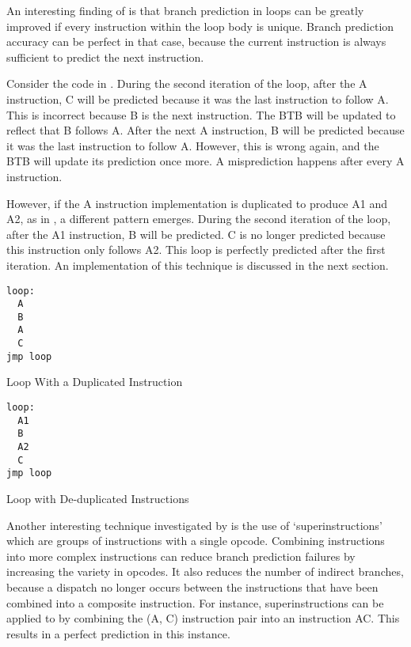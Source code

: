 		An interesting finding of \cite{optimizingindirectbranch} is that branch prediction in loops can be greatly improved if every instruction within the loop body is unique. Branch prediction accuracy can be perfect in that case, because the current instruction is always sufficient to predict the next instruction. 
		
		Consider the code in . During the second iteration of the loop, after the A instruction, C will be predicted because it was the last instruction to follow A. This is incorrect because B is the next instruction. The BTB will be updated to reflect that B follows A. After the next A instruction, B will be predicted because it was the last instruction to follow A. However, this is wrong again, and the BTB will update its prediction once more. A misprediction happens after every A instruction.
		
		However, if the A instruction implementation is duplicated to produce A1 and A2, as in , a different pattern emerges. During the second iteration of the loop, after the A1 instruction, B will be predicted. C is no longer predicted because this instruction only follows A2. This loop is perfectly predicted after the first iteration. An implementation of this technique is discussed in the next section.
		
		\begin{doublefig}
			\begin{halffig}
				\begin{lstlisting}
loop:
  A
  B
  A
  C
jmp loop
  				\end{lstlisting}
				\caption{Loop With a Duplicated Instruction}
				\label{fig:duplicatedinstructions}
			\end{halffig}
			\begin{halffig}
				\begin{lstlisting}
loop:
  A1
  B
  A2
  C
jmp loop
				\end{lstlisting}
				\caption{Loop with De-duplicated Instructions}
				\label{fig:deduplicatedinstructions}
			\end{halffig}
		\end{doublefig}
		
		
		
		Another interesting technique investigated by \citeauthor{optimizingindirectbranch} is the use of `superinstructions' which are groups of instructions with a single opcode. Combining instructions into more complex instructions can reduce branch prediction failures by increasing the variety in opcodes. It also reduces the number of indirect branches, because a dispatch no longer occurs between the instructions that have been combined into a composite instruction. For instance, superinstructions can be applied to  by combining the (A, C) instruction pair into an instruction AC. This results in a perfect prediction in this instance.
		
